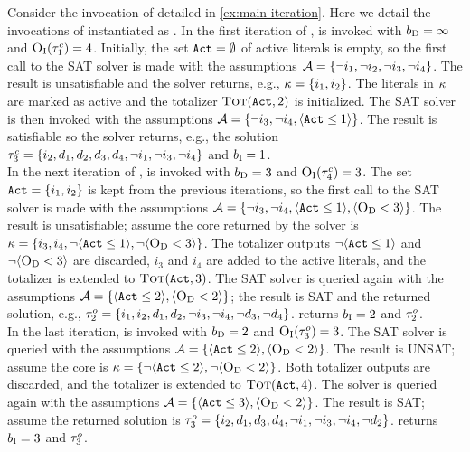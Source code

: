 
\begin{example}\label{ex:msu}
  Consider the invocation of \algname{} detailed in \cref{ex:main-iteration}. 
  Here we detail the invocations of \Min{} instantiated as \msu{}. 
  In the first iteration of \algname{}, \msu{} is invoked with $b_{\text{D}} =\infty$ and $\textsc{O}_{\text{I}}(\tau^c_1) = 4$.
  Initially, the set $\texttt{Act} = \emptyset$ of active literals is empty, so the first call to the SAT solver is made with the assumptions $\mathcal{A} =  \{ \lnot i_1, \lnot i_2, \lnot i_3, \lnot i_4\}$.
  The result is unsatisfiable and the solver returns, e.g., $\kappa = \{i_1, i_2\}$. 
  The literals in $\kappa$ are marked as active and the totalizer $\textsc{Tot}(\texttt{Act}, 2)$ is initialized.
  The SAT solver is then invoked with the assumptions $\mathcal{A} = \{ \lnot i_3, \lnot i_4, \langle \texttt{Act} \leq 1 \rangle\}$. 
  The result is satisfiable so the solver returns, e.g., the solution $\tau^c_3 = \{i_2,\allowbreak d_1,\allowbreak d_2,\allowbreak d_3,\allowbreak d_4,\allowbreak \lnot i_1,\allowbreak \lnot i_3,\allowbreak \lnot i_4\}$ and $b_{\text{I}} = 1$. \\
  In the next iteration of \algname{}, \msu{} is invoked with $b_{\text{D}} = 3$ and $\textsc{O}_{\text{I}}(\tau^c_4) = 3$.
  The set $\texttt{Act} = \{i_1, i_2\}$ is kept from the previous iterations, so the first call to the SAT solver is made with the assumptions  $\mathcal{A} = \{ \lnot i_3, \lnot i_4, \langle \texttt{Act} \leq 1 \rangle,  \langle \textsc{O}_{\text{D}} < 3 \rangle \}$.
  The result is unsatisfiable;
  assume the core returned by the solver is $\kappa = \{i_3, i_4, \lnot \langle \texttt{Act} \leq 1 \rangle, \lnot \langle \textsc{O}_{\text{D}} < 3 \rangle\}$.
  The totalizer outputs $\lnot \langle \texttt{Act} \leq 1 \rangle$ and $\lnot \langle \textsc{O}_{\text{D}} < 3 \rangle$ are discarded, $i_3$ and $i_4$ are added to the active literals, and the totalizer is extended to $\textsc{Tot}(\texttt{Act}, 3)$.
  The SAT solver is queried again with the assumptions $\mathcal{A} = \{\langle \texttt{Act} \leq 2 \rangle, \langle \textsc{O}_{\text{D}} < 2 \rangle\}$;
  the result is SAT and the returned solution, e.g., $\tau^o_2 = \{i_1,\allowbreak i_2,\allowbreak d_1,\allowbreak d_2,\allowbreak \lnot i_3,\allowbreak \lnot i_4,\allowbreak \lnot d_3,\allowbreak \lnot d_4\}$.
  \msu{} returns $b_{\text{I}} = 2$ and $\tau^o_2$. \\
  In the last iteration, \msu{} is invoked with $b_{\text{D}} = 2$ and $\textsc{O}_{\text{I}}(\tau^o_3) = 3$.
  The SAT solver is queried with the assumptions $\mathcal{A} = \{\langle \texttt{Act} \leq 2 \rangle, \langle \textsc{O}_{\text{D}} < 2 \rangle\}$.
  The result is UNSAT;
  assume the core is $\kappa = \{ \lnot \langle \texttt{Act} \leq 2 \rangle, \lnot \langle \textsc{O}_{\text{D}} < 2 \rangle \}$.
  Both totalizer outputs are discarded, and the totalizer is extended to $\textsc{Tot}(\texttt{Act}, 4)$.
  The solver is queried again with the assumptions $\mathcal{A} = \{\langle \texttt{Act} \leq 3 \rangle, \langle \textsc{O}_{\text{D}} < 2 \rangle\}$.
  The result is SAT;
  assume the returned solution is $\tau^o_3 = \{i_2,\allowbreak d_1,\allowbreak d_3,\allowbreak d_4,\allowbreak \lnot i_1,\allowbreak \lnot i_3,\allowbreak \lnot i_4,\allowbreak \lnot d_2\}$.
  \msu{} returns $b_{\text{I}} = 3$ and $\tau^o_3$.
\end{example}

